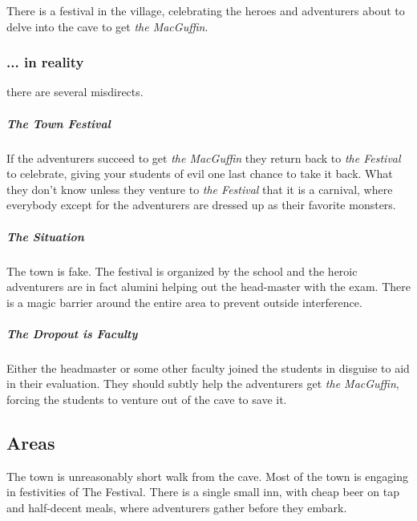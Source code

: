 \documentclass[letterpaper,twocolumn,openany,nodeprecatedcode]{dndbook}
\begin{document}
There is a festival in the village, celebrating the heroes and adventurers about to delve into the cave to get \emph{the MacGuffin}.

\subsubsection{... in reality}
there are several misdirects.

\subparagraph{The Town Festival} If the adventurers succeed to get \emph{the MacGuffin} they return back to \emph{the Festival} to celebrate, giving your students of evil one last chance to take it back. What they don't know unless they venture to \emph{the Festival} that it is a carnival, where everybody except for the adventurers are dressed up as their favorite monsters.

\subparagraph{The Situation} The town is fake. The festival is organized by the school and the heroic adventurers are in fact alumini helping out the head-master with the exam. There is a magic barrier around the entire area to prevent outside interference.

\subparagraph{The Dropout is Faculty} Either the headmaster or some other faculty joined the students in disguise to aid in their evaluation. They should subtly help the adventurers get \emph{the MacGuffin}, forcing the students to venture out of the cave to save it.

\subsection{Areas}

\centering
{}

The town is unreasonably short walk from the cave. Most of the town is engaging in festivities of The Festival.
There is a single small inn, with cheap beer on tap and half-decent meals, where adventurers gather before they embark.
\end{document}
